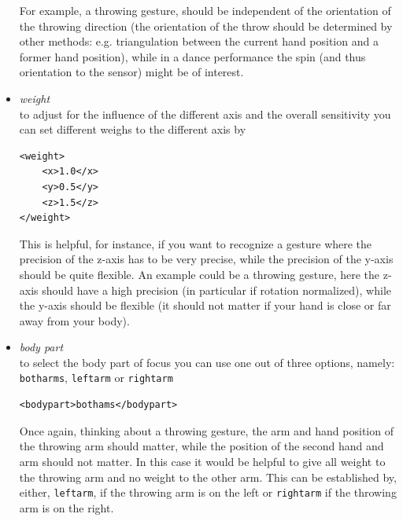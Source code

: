 \documentclass[titlepage,12pt,a4paper]{article}
\begin{document}
\begin{itemize}
For example, a throwing gesture, should be independent of the orientation of the throwing direction (the orientation of the throw should be determined by other methods: e.g. triangulation between the current hand position and a former hand position), while in a dance performance the spin (and thus orientation to the sensor) might be of interest.
\item \emph{weight} \\ to adjust for the influence of the different axis and the overall sensitivity you can set different weighs to the different axis by\begin{verbatim}
<weight>
    <x>1.0</x>
    <y>0.5</y>
    <z>1.5</z>
</weight>\end{verbatim}
This is helpful, for instance, if you want to recognize a gesture where the precision of the z-axis has to be very precise, while the precision of the y-axis should be quite flexible. An example could be a throwing gesture, here the z-axis should have a high precision (in particular if rotation normalized), while the y-axis should be flexible (it should not matter if your hand is close or far away from your body).
\item \emph{body part} \\ to select the body part of focus you can use one out of three options, namely: \texttt{botharms}, \texttt{leftarm} or \texttt{rightarm} \begin{verbatim}
<bodypart>bothams</bodypart>
\end{verbatim}
Once again, thinking about a throwing gesture, the arm and hand position of the throwing arm should matter, while the position of the second hand and arm should not matter. In this case it would be helpful to give all weight to the throwing arm and no weight to the other arm. This can be established by, either, \texttt{leftarm}, if the throwing arm is on the left or \texttt{rightarm} if the throwing arm is on the right.
\end{itemize}
\end{document}
